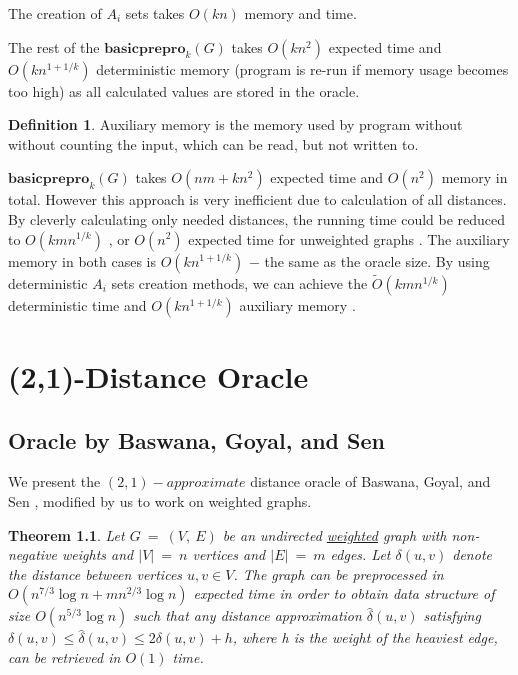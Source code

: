 \documentclass[shortabstract, lic, english]{iithesis}
\theoremstyle{definition} \newtheorem{definition}{Definition}[chapter]
\theoremstyle{plain} \newtheorem{remark}[definition]{Observation}
\theoremstyle{plain} \newtheorem{theorem}[definition]{Theorem}
\theoremstyle{plain} \newtheorem{lemma}[definition]{Lemma}
\theoremstyle{plain} \newtheorem{conjecture}[definition]{Conjecture}
\begin{document}
The creation of $A_i$ sets takes $O(kn)$ memory and time.

The rest of the $\mathbf{basicprepro}_k(G)$ takes $O(kn^2)$ expected time and 
$O(kn^{1 + 1/k})$ deterministic memory (program is re-run if memory usage becomes too high)
as all calculated values are stored in the oracle.

\begin{definition}
    Auxiliary memory is the memory used by program without without counting the input, which can be read, but not written to.
\end{definition}

$\mathbf{basicprepro}_k(G)$ takes $O(nm + kn^2)$ expected time and $O(n^2)$ memory in total.
However this approach is very inefficient due to calculation of all distances. By cleverly calculating only needed distances,
the running time could be reduced to $O(kmn^{1/k})$ \cite{21OracleBasic}, or $O(n^2)$ expected time for unweighted graphs \cite{a0OraclesN2Time}.
The auxiliary memory in both cases is $O(kn^{1 + 1/k})$ $-$ the same as the oracle size.
By using deterministic $A_i$ sets creation methods,
we can achieve the $\tilde{O}(kmn^{1/k})$ deterministic time and $O(kn^{1 + 1/k})$ auxiliary memory \cite{a0OraclesMN1KDeterministicTime}.


\chapter{(2,1)-Distance Oracle} \label{21DistanceOracle}

\section{Oracle by Baswana, Goyal, and Sen}

We present the $(2,1)-approximate$ distance oracle of Baswana, Goyal, and Sen \cite{21OracleBasic},
modified by us to work on weighted graphs.


\begin{theorem}
    Let $G~=~(V,~E)$ be an undirected \underline{weighted} graph with non-negative weights and $|V|~=~n$ vertices and $|E|~=~m$ edges.
    Let $\delta(u,v)$ denote the distance between vertices $u,v \in V$.
    The graph can be preprocessed in $O(n^{7/3} \log n + mn^{2/3} \log n)$ expected time
    in order to obtain data structure of size $O(n^{5/3} \log n)$ such that any distance approximation
    $\hat{\delta}(u,v)$ satisfying $\delta(u,v)\leq \hat{\delta}(u,v)\leq 2\delta(u, v) + h$, where h is the weight of the heaviest edge,
    can be retrieved in $O(1)$ time.
\end{theorem}
\end{document}
